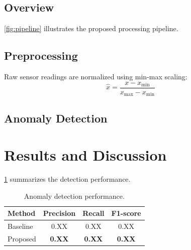 \documentclass[preprint,12pt,authoryear]{elsarticle}
\begin{document}

\subsection{Overview}

\cref{fig:pipeline} illustrates the proposed processing pipeline.

\subsection{Preprocessing}

Raw sensor readings are normalized using min-max scaling:
\begin{equation}
  \hat{x} = \frac{x - x_{\min}}{x_{\max} - x_{\min}}
  \label{eq:normalization}
\end{equation}

\subsection{Anomaly Detection}


\section{Results and Discussion}
\label{sec:results}


\cref{tab:results} summarizes the detection performance.

\begin{table}[ht]
\centering
\caption{Anomaly detection performance.}
\label{tab:results}
\begin{tabular}{lccc}
\toprule
Method & Precision & Recall & F1-score \\
\midrule
Baseline    & 0.XX & 0.XX & 0.XX \\
Proposed    & \textbf{0.XX} & \textbf{0.XX} & \textbf{0.XX} \\
\bottomrule
\end{tabular}
\end{table}
\end{document}
